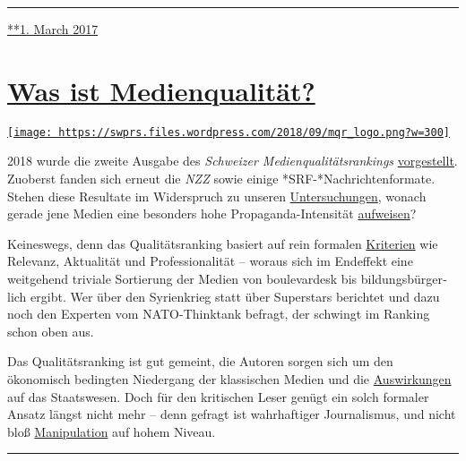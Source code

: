 \begin{center}\rule{0.5\linewidth}{\linethickness}\end{center}

\href{https://swprs.org/2017/03/01/schweizer-medien-vertrauen/}{**1.
March 2017}

\hypertarget{was-ist-medienqualituxe4t}{%
\section{\texorpdfstring{\href{https://swprs.org/2017/03/01/medienqualitaet/}{Was
ist
Medienqualität?}}{Was ist Medienqualität?}}\label{was-ist-medienqualituxe4t}}

\href{https://swprs.org/2017/03/01/medienqualitaet/}{\texttt{[image: https://swprs.files.wordpress.com/2018/09/mqr\_logo.png?w=300]}}

2018 wurde die zweite Ausgabe des \emph{Schweizer
Medien­qualitäts­rankings}
\href{http://medienqualitaet-schweiz.ch/files/3115/3578/3114/MQR-18_Hauptbefunde.pdf}{vorgestellt}.
Zuoberst fanden sich erneut die \emph{NZZ} sowie einige
*SRF-*Nach­rich­ten­for­mate. Stehen diese Resultate im Widerspruch zu
unseren \href{https://swprs.org/die-nzz-studie/}{Untersuchungen}, wonach
gerade jene Medien eine besonders hohe Propaganda-Intensität
\href{https://swprs.org/srf-propaganda-analyse/}{aufweisen}?

Keineswegs, denn das Qualitätsranking basiert auf rein formalen
\href{http://www.medienqualitaet-schweiz.ch/index.php/qualitaetsrating/}{Kriterien}
wie Relevanz, Aktualität und Professionalität -- woraus sich im
Endeffekt eine weitgehend triviale Sortierung der Medien von
boulevardesk bis bildungs­bürger­lich ergibt. Wer über den Syrienkrieg
statt über Superstars berichtet und dazu noch den Experten vom
NATO-Thinktank befragt, der schwingt im Ranking schon oben aus.

Das Qualitätsranking ist gut gemeint, die Autoren sorgen sich um den
ökonomisch bedingten Niedergang der klassischen Medien und die
\href{https://www.nzz.ch/feuilleton/medien/was-die-medien-fuer-die-schweizer-demokratie-leisten-ld.1416854}{Auswirkungen}
auf das Staatswesen. Doch für den kritischen Leser genügt ein solch
formaler Ansatz längst nicht mehr -- denn gefragt ist wahrhaftiger
Journalismus, und nicht bloß
\href{https://swprs.org/der-propaganda-schluessel/}{Manipulation} auf
hohem Niveau.

\begin{center}\rule{0.5\linewidth}{\linethickness}\end{center}

